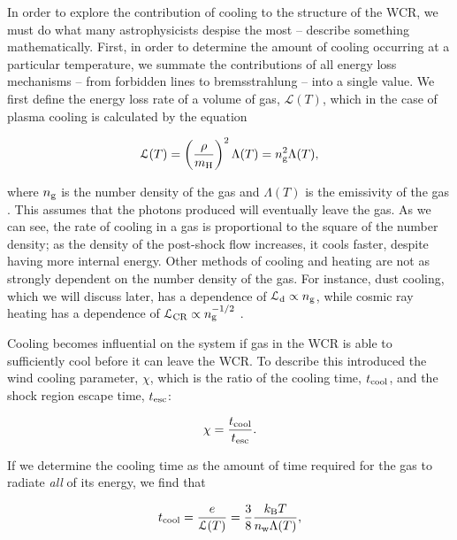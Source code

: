 In order to explore the contribution of cooling to the structure of the WCR, we must do what many astrophysicists despise the most -- describe something mathematically.
First, in order to determine the amount of cooling occurring at a particular temperature, we summate the contributions of all energy loss mechanisms -- from forbidden lines to bremsstrahlung -- into a single value.
We first define the energy loss rate of a volume of gas, $\mathcal{L}(T)$, which in the case of plasma cooling is calculated by the equation

\begin{equation}
  \label{eq:energylossrate}
  \mathcal{L}(T) = \left(\frac{\rho}{m_\text{H}}\right)^2 \Lambda(T) = n_\text{g}^2 \Lambda(T) , 
\end{equation}

\noindent
where $n_\text{g}$ is the number density of the gas and $\Lambda(T)$ is the emissivity of the gas \parencite{stevens_colliding_1992}.
This assumes that the photons produced will eventually leave the gas.
As we can see, the rate of cooling in a gas is proportional to the square of the number density; as the density of the post-shock flow increases, it cools faster, despite having more internal energy.
Other methods of cooling and heating are not as strongly dependent on the number density of the gas.
For instance, dust cooling, which we will discuss later, has a dependence of $\mathcal{L}_\text{d} \propto n_\text{g}$, while cosmic ray heating has a dependence of $\mathcal{L}_\text{CR} \propto n_\text{g}^{-1/2}$ \parencite{wienerCosmicRayHeating2013}.

Cooling becomes influential on the system if gas in the WCR is able to sufficiently cool before it can leave the WCR.
To describe this \textcite{stevens_colliding_1992} introduced the wind cooling parameter, $\chi$, which is the ratio of the cooling time, $t_\text{cool}$, and the shock region escape time, $t_\text{esc}$:

\begin{equation}
  \chi = \frac{t_\text{cool}}{t_\text{esc}}.
\end{equation}

\noindent
If we determine the cooling time as the amount of time required for the gas to radiate \emph{all} of its energy, we find that

\begin{equation}
  \label{eq:taucool}
  t_\text{cool} = \frac{e}{\mathcal{L}(T)} = \frac{3}{8} \frac{k_\text{B} T}{n_\text{w} \Lambda(T)},
\end{equation}

